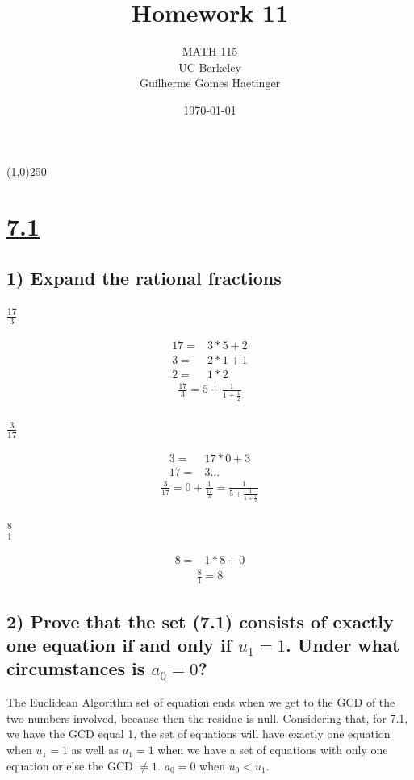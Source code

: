 \documentclass[11pt]{article}
\author{MATH 115 \\ UC Berkeley \\ Guilherme Gomes Haetinger}
\date{\today}
\title{\huge Homework 11}
\begin{document}
\maketitle
\begin{center}
\line(1,0){250}
\end{center}

\section*{\underline{7.1}}
\label{sec:orgc186b6d}

\subsection*{1) Expand the rational fractions}
\label{sec:org6fb4a82}
\subsubsection*{\(\frac{17}{3}\)}
\label{sec:org3f412bc}
\begin{eqnarray*}
  17 =& 3*5 + 2 \\
  3 =& 2*1 + 1 \\
  2 =& 1*2
\end{eqnarray*}
\begin{eqnarray*}
  \frac{17}{3} = 5 + \frac{1}{1 + \frac{1}{2}}
\end{eqnarray*}
\subsubsection*{\(\frac{3}{17}\)}
\label{sec:org00b65bd}
\begin{eqnarray*}
  3 =& 17*0 + 3 \\
  17 =& 3 ...
\end{eqnarray*}
\begin{eqnarray*}
  \frac{3}{17} = 0 + \frac{1}{\frac{17}{3}} = \frac{1}{5 + \frac{1}{1 + \frac{1}{2}}}
\end{eqnarray*}
\subsubsection*{\(\frac{8}{1}\)}
\label{sec:org3ca186d}
\begin{eqnarray*}
  8 =& 1*8 + 0
\end{eqnarray*}
\begin{eqnarray*}
  \frac{8}{1} = 8
\end{eqnarray*}

\subsection*{2) Prove that the set (7.1) consists of exactly one equation if and only if \(u_1 = 1\). Under what circumstances is \(a_0 = 0\)?}
\label{sec:org145beb6}
The Euclidean Algorithm set of equation ends when we get to the GCD of the two numbers involved, because then the residue is null. Considering that, for 7.1, we have the GCD equal 1, the set of equations will have exactly one equation when \(u_1 = 1\) as well as \(u_1 = 1\) when we have a set of equations with only one equation or else the GCD \(\not= 1\).
\(a_0 = 0\) when \(u_0 < u_1\).
\end{document}
